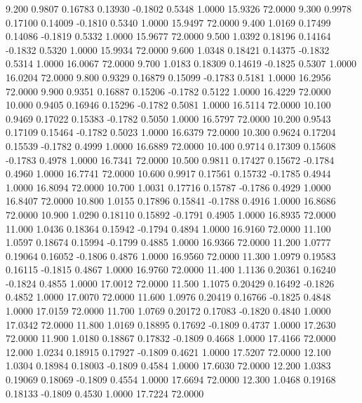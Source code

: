    9.200   0.9807   0.16783   0.13930  -0.1802   0.5348   1.0000  15.9326  72.0000
   9.300   0.9978   0.17100   0.14009  -0.1810   0.5340   1.0000  15.9497  72.0000
   9.400   1.0169   0.17499   0.14086  -0.1819   0.5332   1.0000  15.9677  72.0000
   9.500   1.0392   0.18196   0.14164  -0.1832   0.5320   1.0000  15.9934  72.0000
   9.600   1.0348   0.18421   0.14375  -0.1832   0.5314   1.0000  16.0067  72.0000
   9.700   1.0183   0.18309   0.14619  -0.1825   0.5307   1.0000  16.0204  72.0000
   9.800   0.9329   0.16879   0.15099  -0.1783   0.5181   1.0000  16.2956  72.0000
   9.900   0.9351   0.16887   0.15206  -0.1782   0.5122   1.0000  16.4229  72.0000
  10.000   0.9405   0.16946   0.15296  -0.1782   0.5081   1.0000  16.5114  72.0000
  10.100   0.9469   0.17022   0.15383  -0.1782   0.5050   1.0000  16.5797  72.0000
  10.200   0.9543   0.17109   0.15464  -0.1782   0.5023   1.0000  16.6379  72.0000
  10.300   0.9624   0.17204   0.15539  -0.1782   0.4999   1.0000  16.6889  72.0000
  10.400   0.9714   0.17309   0.15608  -0.1783   0.4978   1.0000  16.7341  72.0000
  10.500   0.9811   0.17427   0.15672  -0.1784   0.4960   1.0000  16.7741  72.0000
  10.600   0.9917   0.17561   0.15732  -0.1785   0.4944   1.0000  16.8094  72.0000
  10.700   1.0031   0.17716   0.15787  -0.1786   0.4929   1.0000  16.8407  72.0000
  10.800   1.0155   0.17896   0.15841  -0.1788   0.4916   1.0000  16.8686  72.0000
  10.900   1.0290   0.18110   0.15892  -0.1791   0.4905   1.0000  16.8935  72.0000
  11.000   1.0436   0.18364   0.15942  -0.1794   0.4894   1.0000  16.9160  72.0000
  11.100   1.0597   0.18674   0.15994  -0.1799   0.4885   1.0000  16.9366  72.0000
  11.200   1.0777   0.19064   0.16052  -0.1806   0.4876   1.0000  16.9560  72.0000
  11.300   1.0979   0.19583   0.16115  -0.1815   0.4867   1.0000  16.9760  72.0000
  11.400   1.1136   0.20361   0.16240  -0.1824   0.4855   1.0000  17.0012  72.0000
  11.500   1.1075   0.20429   0.16492  -0.1826   0.4852   1.0000  17.0070  72.0000
  11.600   1.0976   0.20419   0.16766  -0.1825   0.4848   1.0000  17.0159  72.0000
  11.700   1.0769   0.20172   0.17083  -0.1820   0.4840   1.0000  17.0342  72.0000
  11.800   1.0169   0.18895   0.17692  -0.1809   0.4737   1.0000  17.2630  72.0000
  11.900   1.0180   0.18867   0.17832  -0.1809   0.4668   1.0000  17.4166  72.0000
  12.000   1.0234   0.18915   0.17927  -0.1809   0.4621   1.0000  17.5207  72.0000
  12.100   1.0304   0.18984   0.18003  -0.1809   0.4584   1.0000  17.6030  72.0000
  12.200   1.0383   0.19069   0.18069  -0.1809   0.4554   1.0000  17.6694  72.0000
  12.300   1.0468   0.19168   0.18133  -0.1809   0.4530   1.0000  17.7224  72.0000
